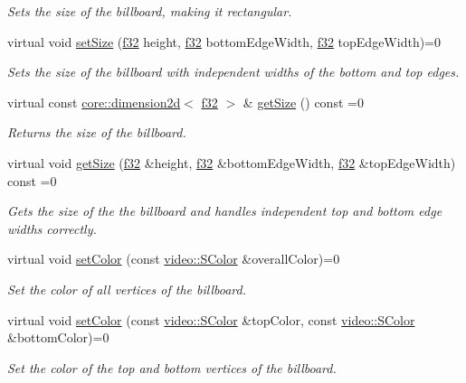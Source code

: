 \begin{DoxyCompactItemize}
\begin{DoxyCompactList}\small\item\em Sets the size of the billboard, making it rectangular. \end{DoxyCompactList}\item 
virtual void \hyperlink{classirr_1_1scene_1_1IBillboardSceneNode_a9a5d47a00bb0160daab8fa53453a2ba4}{set\+Size} (\hyperlink{namespaceirr_a0277be98d67dc26ff93b1a6a1d086b07}{f32} height, \hyperlink{namespaceirr_a0277be98d67dc26ff93b1a6a1d086b07}{f32} bottom\+Edge\+Width, \hyperlink{namespaceirr_a0277be98d67dc26ff93b1a6a1d086b07}{f32} top\+Edge\+Width)=0
\begin{DoxyCompactList}\small\item\em Sets the size of the billboard with independent widths of the bottom and top edges. \end{DoxyCompactList}\item 
virtual const \hyperlink{classirr_1_1core_1_1dimension2d}{core\+::dimension2d}$<$ \hyperlink{namespaceirr_a0277be98d67dc26ff93b1a6a1d086b07}{f32} $>$ \& \hyperlink{classirr_1_1scene_1_1IBillboardSceneNode_ada77331a59e5b45d4cbb963f8826bbd4}{get\+Size} () const  =0
\begin{DoxyCompactList}\small\item\em Returns the size of the billboard. \end{DoxyCompactList}\item 
virtual void \hyperlink{classirr_1_1scene_1_1IBillboardSceneNode_a58d336f020732ebcda44c5c9f57e9495}{get\+Size} (\hyperlink{namespaceirr_a0277be98d67dc26ff93b1a6a1d086b07}{f32} \&height, \hyperlink{namespaceirr_a0277be98d67dc26ff93b1a6a1d086b07}{f32} \&bottom\+Edge\+Width, \hyperlink{namespaceirr_a0277be98d67dc26ff93b1a6a1d086b07}{f32} \&top\+Edge\+Width) const  =0
\begin{DoxyCompactList}\small\item\em Gets the size of the the billboard and handles independent top and bottom edge widths correctly. \end{DoxyCompactList}\item 
virtual void \hyperlink{classirr_1_1scene_1_1IBillboardSceneNode_a82c1038a6dfcd255863baa96aaba4182}{set\+Color} (const \hyperlink{classirr_1_1video_1_1SColor}{video\+::\+S\+Color} \&overall\+Color)=0
\begin{DoxyCompactList}\small\item\em Set the color of all vertices of the billboard. \end{DoxyCompactList}\item 
virtual void \hyperlink{classirr_1_1scene_1_1IBillboardSceneNode_a13efdfa73998706baf10cedcdb48d559}{set\+Color} (const \hyperlink{classirr_1_1video_1_1SColor}{video\+::\+S\+Color} \&top\+Color, const \hyperlink{classirr_1_1video_1_1SColor}{video\+::\+S\+Color} \&bottom\+Color)=0
\begin{DoxyCompactList}\small\item\em Set the color of the top and bottom vertices of the billboard. \end{DoxyCompactList}\end{DoxyCompactItemize}

